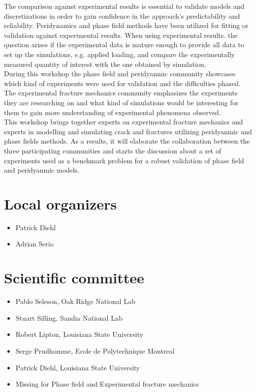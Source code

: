 The comparison against experimental results is essential to validate models and discretizations in order to gain confidence in the approach’s predictability and reliability. Peridynamics and phase field methods have been utilized for fitting or validation against experimental results. When using experimental results. the question arises if the experimental data is mature enough to provide all data to set up the simulations, e.g. applied loading, and compare the experimentally measured quantity of interest with the one obtained by simulation. \\

During this workshop the phase field and peridyanmic community showcases which kind of experiments were used for validation and the difficulties phased. The experimental fracture mechanics community emphasizes the experiments they are researching on and what kind of simulations would be interesting for them to gain more understanding of experimental phenomena observed. \\

This workshop brings together experts on experimental fracture mechanics and experts in modelling and simulating crack and fractures utilizing peridyanmic and phase fields methods. As a results, it will elaborate the collaboration between the three participating communities and starts the discussion about a set of experiments used as a benchmark problem for a robust validation of phase field and peridyanmic models.




\section*{Local organizers}
\begin{itemize}
    \item Patrick Diehl
    \item Adrian Serio
\end{itemize}

\section*{Scientific committee}
\begin{itemize}
\item Pablo Seleson, Oak Ridge National Lab
\item Stuart Silling, Sandia National Lab
\item Robert Lipton, Louisiana State University
\item Serge Prudhomme, Ecole de Polytechnique Montreal
\item Patrick Diehl, Louisiana State University
\item Missing for Phase field and Experimental fracture mechanics
\end{itemize}
